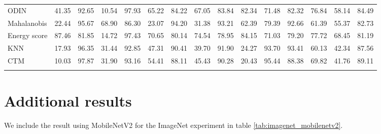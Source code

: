 \documentclass[nohyperref]{article}
\theoremstyle{plain}
\theoremstyle{definition}
\theoremstyle{remark}
\newcommand{\shortname}{CTM}
\begin{document}
\begin{table}
{\begin{tabular}{lllllllllllllll}
ODIN & 41.35 & 92.65 & 10.54 & 97.93 & 65.22 & 84.22 & 67.05 & 83.84 & 82.34 & 71.48 & 82.32 & 76.84 & 58.14 & 84.49 \\
Mahalanobis & 22.44 & 95.67 & 68.90 & 86.30 & 23.07 & 94.20 & 31.38 & 93.21 & 62.39 & 79.39 & 92.66 & 61.39 & 55.37 & 82.73 \\
Energy score & 87.46 & 81.85 & 14.72 & 97.43 & 70.65 & 80.14 & 74.54 & 78.95 & 84.15 & 71.03 & 79.20 & 77.72 & 68.45 & 81.19 \\ 
KNN & 17.93 & 96.35 & 31.44 & 92.85 & 47.31 & 90.41 & 39.70 & 91.90 & 24.27 & 93.70 & 93.41 & 60.13 & 42.34 & 87.56 \\
\shortname & 10.03 & 97.87 & 31.90 & 93.16 & 54.41 & 88.11 & 45.43 & 90.28 & 20.43 & 95.44 & 88.38 & 69.82 & 41.76 & 89.11 \\
\\ \bottomrule
\end{tabular}}
\label{tab:detailresultscifar100}
\end{table}


\section{Additional results}
We include the result using MobileNetV2 \cite{sandler2018mobilenetv2} for the ImageNet experiment in table \ref{tab:imagenet_mobilenetv2}.
\end{document}
